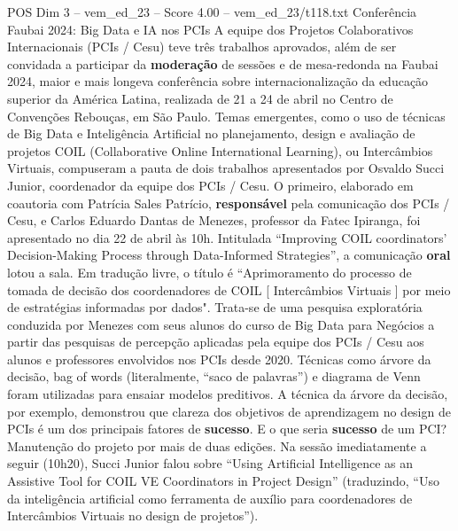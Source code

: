 \begin{textsample}{POS Dim 3 – vem\_ed\_23 – Score 4.00 – vem\_ed\_23/t118.txt}  \label{ex:f3_pos_100}
Conferência Faubai 2024: Big Data e IA nos PCIs A equipe dos Projetos Colaborativos Internacionais (PCIs / Cesu) teve três trabalhos aprovados, além de ser convidada a participar da \textbf{moderação} de sessões e de mesa-redonda na Faubai 2024, maior e mais longeva conferência sobre internacionalização da educação superior da América Latina, realizada de 21 a 24 de abril no Centro de Convenções Rebouças, em São Paulo.
Temas emergentes, como o uso de técnicas de Big Data e Inteligência Artificial no planejamento, design e avaliação de projetos COIL (Collaborative Online International Learning), ou Intercâmbios Virtuais, compuseram a pauta de dois trabalhos apresentados por Osvaldo Succi Junior, coordenador da equipe dos PCIs / Cesu.
O primeiro, elaborado em coautoria com Patrícia Sales Patrício, \textbf{responsável} pela comunicação dos PCIs / Cesu, e Carlos Eduardo Dantas de Menezes, professor da Fatec Ipiranga, foi apresentado no dia 22 de abril às 10h.
Intitulada “Improving COIL coordinators’ Decision-Making Process through Data-Informed Strategies”, a comunicação \textbf{oral} lotou a sala.
Em tradução livre, o título é “Aprimoramento do processo de tomada de decisão dos coordenadores de COIL [ Intercâmbios Virtuais ] por meio de estratégias informadas por dados".
Trata-se de uma pesquisa exploratória conduzida por Menezes com seus alunos do curso de Big Data para Negócios a partir das pesquisas de percepção aplicadas pela equipe dos PCIs / Cesu aos alunos e professores envolvidos nos PCIs desde 2020.
Técnicas como árvore da decisão, bag of words (literalmente, “saco de palavras”) e diagrama de Venn foram utilizadas para ensaiar modelos preditivos.
A técnica da árvore da decisão, por exemplo, demonstrou que clareza dos objetivos de aprendizagem no design de PCIs é um dos principais fatores de \textbf{sucesso}.
E o que seria \textbf{sucesso} de um PCI?
Manutenção do projeto por mais de duas edições.
Na sessão imediatamente a seguir (10h20), Succi Junior falou sobre “Using Artificial Intelligence as an Assistive Tool for COIL VE Coordinators in Project Design” (traduzindo, “Uso da inteligência artificial como ferramenta de auxílio para coordenadores de Intercâmbios Virtuais no design de projetos”).

\end{textsample}
